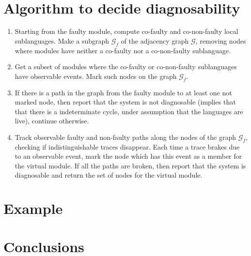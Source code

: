 \documentclass[a4paper, 10pt, conference]{ieeeconf}
\begin{document}
\section{Algorithm to decide diagnosability}
\label{sec:Algorithm}

\begin{enumerate}
  \item Starting from the faulty module, compute co-faulty and co-non-faulty
  local sublanguages. Make a subgraph $\mathcal{G}_f$ of the adjacency graph
  $\mathcal{G}$, removing nodes where modules have neither a co-faulty nor a
  co-non-faulty sublanguage.
  
  \item Get a subset of modules where the co-faulty or co-non-faulty
  sublanguages have observable events. Mark such nodes on the graph
  $\mathcal{G}_f$.
  
  \item If there is a path in the graph from the faulty module to at least one
  not marked node, then report that the system is not diagnosable (implies that
  that there is a indeterminate cycle, under assumption that the languages are
  live), continue otherwise.
  
  \item Track observable faulty and non-faulty paths along the nodes of the
  graph $\mathcal{G}_f$, checking if indistinguishable traces disappear. Each
  time a trace brakes due to an observable event, mark the node which has this
  event as a member for the virtual module. If all the paths are broken, then
  report that the system is diagnosable and return the set of nodes for the
  virtual module.
\end{enumerate}


\section{Example}
\label{sec:Example}


\section{Conclusions}
\label{sec:Conclusions}




\end{document}
